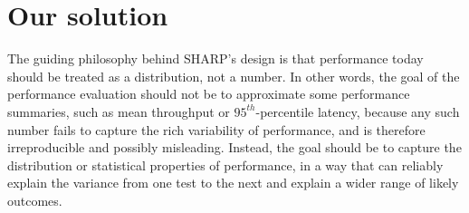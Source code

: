 \documentclass[11pt]{article}
\begin{document}
\begin{comment}

We address this gap by automating not only the production of detailed descriptions of the SUT and the benchmark execution, but also the embedding of source code and runtime parameters for both the measurements and the analysis in the reported results.
These details are automatically included in every run, allowing anyone to reproduce, enhance, and correct others' results with minimal configuration.

Another reproducibility challenge stems from noise.
Empirical measurements in computer systems, like all experiments of physical systems, ordinarily involve an element of noise: a variation in measurements that cannot be explained by controlled variations in the SUT
Noise hinders reproducible experimentation because it obscures the interpretation of diverging results: is the divergence due to a material difference in the SUT, or is it primarily within the noise?
In computer systems, this noise can emanate from the underlying hardware, the operating system, or the evaluated software itself.
These sources can be carefully observed, measured, and controlled to minimize some of the noise, but noise can never be fully eliminated, challenging reproducible benchmarking.

Instead of eliminating noise, another common approach to handling noise---which we incorporated holistically into SHARP---is to control for noise using statistical tools.
These tools include primarily the quantification of noise (by plotting of distributions of measurements, computing confidence intervals, etc.) and hypothesis testing (via computation of appropriate statistical tests and p-values).
Both of these approaches require some threshold amount of experimental repetition to produce a statistically meaningful treatment of noise.
The management of repetitions and the computation of noise statistics are all incorporated and automated in the SHARP framework.
\end{comment}

\section*{Our solution}

The guiding philosophy behind SHARP's design is that performance today should be treated as a distribution, not a number.
In other words, the goal of the performance evaluation should not be to approximate some performance summaries, such as mean throughput or $95^{th}$-percentile latency, because any such number fails to capture the rich variability of performance, and is therefore irreproducible and possibly misleading.
Instead, the goal should be to capture the distribution or statistical properties of performance, in a way that can reliably explain the variance from one test to the next and explain a wider range of likely outcomes.
\end{document}
